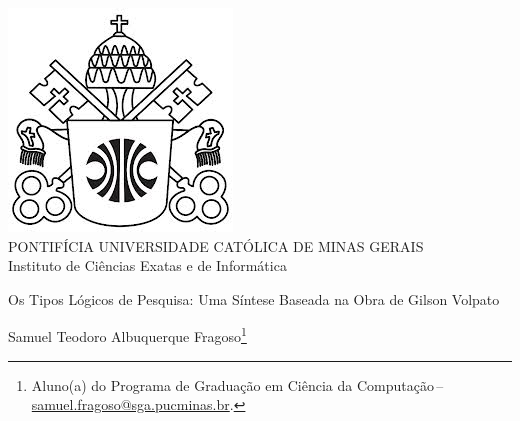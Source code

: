 \documentclass[a4paper,12pt]{article}
\makeatletter
\newcommand{\monog}{Os Tipos Lógicos de Pesquisa: Uma Síntese Baseada na Obra de Gilson Volpato}
\newcommand{\AutorA}{Samuel Teodoro Albuquerque Fragoso}
\newcommand{\funcaoA}{}
\newcommand{\emailA}{\href{mailto:samuel.fragoso@sga.pucminas.br}{samuel.fragoso@sga.pucminas.br}}
\newcommand{\cursA}{Aluno(a) do Programa de Graduação em Ciência da Computação}
\newcommand{\keyword}[1]{\textsf{#1}}
\makeatother
\begin{document}

\begin{center}
\includegraphics[scale=0.2]{figuras/brasao.jpg} \\
PONTIFÍCIA UNIVERSIDADE CATÓLICA DE MINAS GERAIS \\
Instituto de Ciências Exatas e de Informática


\end{center}

 \vspace{0cm} {
 \singlespacing \Large{\monog {} \\ }
 }

\vspace{1.0cm}

\begin{flushright}
\singlespacing 
\normalsize{\AutorA \footnote{\funcaoA \cursA \,-- \emailA . }} \\
\end{flushright}
\thispagestyle{empty}

\vspace{1.0cm}

\begin{abstract}
\noindent
O vídeo de Gilson Volpato elabora que existem 3 tipos de pesquisas, a primeira que não precisa de hipóteses para ter suas perguntas respondidas e as outras duas que precisam da elaboração de hipóteses para guiar o pesquisador ao resultado. Os dois tipos que precisam de hipóteses são divididos em mais dois tipos, que são associação e interferência, as duas testam a relação entre duas ou mais variáveis. No caso da associação é definida quando há associação mas não efito e a interferência quando é encontrada uma relação entre causa e efeito. 
\\\textbf{\keyword{Palavras-chave:}} Metodologia Científica; Tipos de Pesquisa; Hipótese; Causalidade.
\end{abstract}
\end{document}
